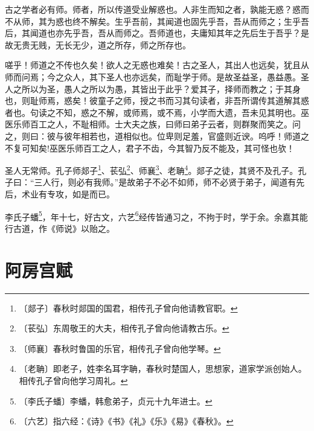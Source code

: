 \documentclass[12pt,UTF-8,openany]{ctexbook}
\begin{document}
\begin{normalsize}
    
    古之学者必有师。师者，所以传道受业解惑也。人非生而知之者，孰能无惑？惑而不从师，其为惑也终不解矣。生乎吾前，其闻道也固先乎吾，吾从而师之；生乎吾后，其闻道也亦先乎吾，吾从而师之。吾师道也，夫庸知其年之先后生于吾乎？是故无贵无贱，无长无少，道之所存，师之所存也。
    
    嗟乎！师道之不传也久矣！欲人之无惑也难矣！古之圣人，其出人也远矣，犹且从师而问焉；今之众人，其下圣人也亦远矣，而耻学于师。是故圣益圣，愚益愚。圣人之所以为圣，愚人之所以为愚，其皆出于此乎？爱其子，择师而教之；于其身也，则耻师焉，惑矣！彼童子之师，授之书而习其句读者，非吾所谓传其道解其惑者也。句读之不知，惑之不解，或师焉，或不焉，小学而大遗，吾未见其明也。巫医乐师百工之人，不耻相师。士大夫之族，曰师曰弟子云者，则群聚而笑之。问之，则曰：彼与彼年相若也，道相似也。位卑则足羞，官盛则近谀。呜呼！师道之不复可知矣!巫医乐师百工之人，君子不齿，今其智乃反不能及，其可怪也欤！
    
    圣人无常师。孔子师郯子\footnote{〔郯子〕春秋时郯国的国君，相传孔子曾向他请教官职。}、苌弘\footnote{〔苌弘〕东周敬王的大夫，相传孔子曾向他请教古乐。}、师襄\footnote{〔师襄〕春秋时鲁国的乐官，相传孔子曾向他学琴。}、老聃\footnote{〔老聃〕即老子，姓李名耳字聃，春秋时楚国人，思想家，道家学派创始人。相传孔子曾向他学习周礼。}。郯子之徒，其贤不及孔子。孔子曰：“三人行，则必有我师。”是故弟子不必不如师，师不必贤于弟子，闻道有先后，术业有专攻，如是而已。
    
    李氏子蟠\footnote{〔李氏子蟠〕李蟠，韩愈弟子，贞元十九年进士。}，年十七，好古文，六艺\footnote{〔六艺〕指六经：《诗》《书》《礼》《乐》《易》《春秋》。}经传皆通习之，不拘于时，学于余。余嘉其能行古道，作《师说》以贻之。
\end{normalsize}



\chapter{阿房宫赋}
\end{document}
